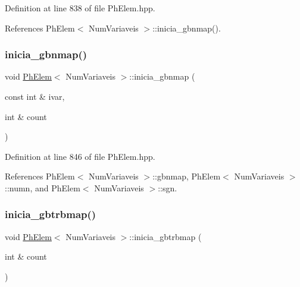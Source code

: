 Definition at line 838 of file Ph\+Elem.\+hpp.



References Ph\+Elem$<$ Num\+Variaveis $>$\+::inicia\+\_\+gbnmap().

\mbox{\label{classPhElem_a3ed7c7027c6fadd45f29eb7de33ee7fb}} 
\subsubsection{\texorpdfstring{inicia\+\_\+gbnmap()}{inicia\_gbnmap()}\hspace{0.1cm}{\footnotesize\ttfamily [2/2]}}
{\footnotesize\ttfamily void \hyperlink{classPhElem}{Ph\+Elem}$<$ Num\+Variaveis $>$\+::inicia\+\_\+gbnmap (\begin{DoxyParamCaption}\item[{const int \&}]{ivar,  }\item[{int \&}]{count }\end{DoxyParamCaption})\hspace{0.3cm}{\ttfamily [inherited]}}



Definition at line 846 of file Ph\+Elem.\+hpp.



References Ph\+Elem$<$ Num\+Variaveis $>$\+::gbnmap, Ph\+Elem$<$ Num\+Variaveis $>$\+::numn, and Ph\+Elem$<$ Num\+Variaveis $>$\+::sgn.

\mbox{\label{classPhElem_a9b5610a7a12eddbc4a9f07429500a6da}} 
\subsubsection{\texorpdfstring{inicia\+\_\+gbtrbmap()}{inicia\_gbtrbmap()}}
{\footnotesize\ttfamily void \hyperlink{classPhElem}{Ph\+Elem}$<$ Num\+Variaveis $>$\+::inicia\+\_\+gbtrbmap (\begin{DoxyParamCaption}\item[{int \&}]{count }\end{DoxyParamCaption})\hspace{0.3cm}{\ttfamily [inherited]}}



